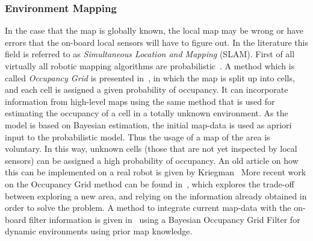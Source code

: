 \subsubsection{Environment Mapping}
In the case that the map is globally known, the local map may be wrong or have
errors that the on-board local sensors will have to figure out. In the
literature this field is referred to as \textit{Simultaneous Location and
  Mapping} (SLAM). First of all virtually all robotic mapping algorithms are
probabilistic~\cite{thrunRoboticMappingSurvey}. %
A method which is called \textit{Occupancy Grid} is presented
in~\cite{elfes1989using}, in which the map is split up into cells, and each cell
is assigned a given probability of occupancy. It can incorporate information
from high-level maps using the same method that is used for estimating the
occupancy of a cell in a totally unknown environment. As the model is based on
Bayesian estimation, the initial map-data is used as apriori input to the
probabilistic model. Thus the usage of a map of the area is voluntary. In this
way, unknown cells (those that are not yet inspected by local sensors) can be
assigned a high probability of occupancy. An old article on how this can be
implemented on a real robot is given by Kriegman~\cite{kriegman1987mobile} More
recent work on the Occupancy Grid method can be found
in~\cite{carrilloAutonomousRoboticExploration2015}, which explores the trade-off
between exploring a new area, and relying on the information already obtained in
order to solve the problem. A method to integrate current map-data with the
on-board filter information is given in~\cite{gindeleBayesianOccupancyGrid2009}
using a Bayesian Occupancy Grid Filter for dynamic environments using prior map
knowledge.

